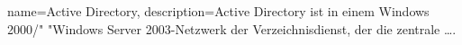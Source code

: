 {name=Active Directory,
description={Active Directory ist in einem Windows 2000/" "Windows
Server 2003-Netzwerk der Verzeichnisdienst, der die zentrale \ldots.}
}

